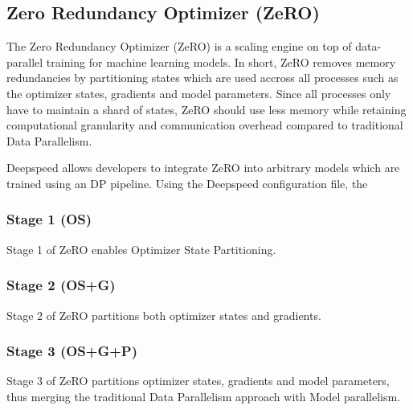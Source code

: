 \subsection{Zero Redundancy Optimizer (ZeRO)}

The Zero Redundancy Optimizer (ZeRO) is a scaling engine on top of data-parallel training for 
machine learning models. In short, ZeRO removes memory redundancies by partitioning states which 
are used accross all processes such as the optimizer states, gradients and model parameters. 
Since all processes only have to maintain a shard of states, ZeRO should use less memory while 
retaining computational granularity and communication overhead compared to traditional Data 
Parallelism.

Deepspeed allows developers to integrate ZeRO into arbitrary models which are trained using an 
DP pipeline. Using the Deepspeed configuration file, the 

\subsubsection{Stage 1 (OS)}

Stage 1 of ZeRO enables Optimizer State Partitioning. 

\subsubsection{Stage 2 (OS+G)}

Stage 2 of ZeRO partitions both optimizer states and gradients.

\subsubsection{Stage 3 (OS+G+P)}

Stage 3 of ZeRO partitions optimizer states, gradients and model parameters, thus merging the 
traditional Data Parallelism approach with Model parallelism.
